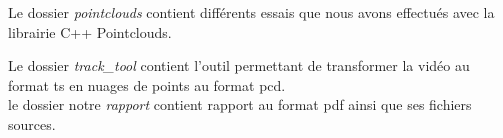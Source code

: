 \vspace{10pt}

Le dossier \textit{pointclouds} contient différents essais que nous avons effectués avec la librairie C++ Pointclouds. \\


\vspace{10pt}

Le dossier \textit{track\_tool} contient l'outil permettant de transformer la vidéo au format ts en nuages de points au format pcd.\\

le dossier notre \textit{rapport} contient rapport au format pdf ainsi que ses fichiers sources.\\

